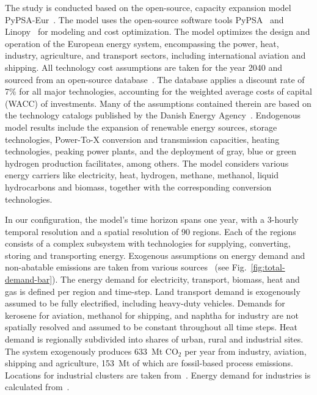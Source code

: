 \documentclass[twocolumn]{article}
\newcommand{\carbon}{CO$_2$}
\begin{document}
The study is conducted based on the open-source, capacity expansion model PyPSA-Eur~\cite{horschPyPSAEurOpenOptimisation2018,brownSynergiesSectorCoupling2018,PyPSAEurSecSectorCoupledOpen2023}.
The model uses the open-source software tools PyPSA~\cite{brownPyPSAPythonPower2018} and Linopy~\cite{hofmannLinopyLinearOptimization2023}
for modeling and cost optimization.
The model optimizes the design and operation of the European energy system, encompassing the power, heat, industry, agriculture, and transport sectors, including international aviation and shipping.
All technology cost assumptions are taken for the year 2040 and sourced from an open-source database~\cite{zeyenPyPSATechnologydataTechnology2023}. The database applies a discount rate of 7\% for all major technologies, accounting for the weighted average costs of capital (WACC) of investments.
Many of the assumptions contained therein are based on the technology catalogs published by the Danish Energy Agency~\cite{danishenergyagencyTechnologyDataGeneration2019,thedanishenergyagencyTechnologyDataCarbon2023}.
Endogenous model results include the expansion of renewable energy sources, storage technologies, Power-To-X conversion and transmission capacities, heating technologies, peaking power plants, and the deployment of gray, blue or green hydrogen production facilitates, among others.
The model considers various energy carriers like electricity, heat, hydrogen, methane, methanol, liquid hydrocarbons and biomass, together with the corresponding conversion technologies.



%
In our configuration, the model's time horizon spans one year, with a 3-hourly temporal resolution and a spatial resolution of 90 regions. Each of the regions consists of a complex subsystem with technologies for supplying, converting, storing and transporting energy. Exogenous assumptions on energy demand and non-abatable emissions are taken from various sources~\cite{piamanzGeoreferencedIndustrialSites2018,muehlenpfordtTimeSeries2019,mantzosJRCIDEES20152018,NationalEmissionsReported2023,EurostatCompleteEnergyBalance,uwekrienDemandlib2023} (see Fig.~\ref{fig:total-demand-bar}). The energy demand for electricity, transport, biomass, heat and gas is defined per region and time-step.
Land transport demand is exogenously assumed to be fully electrified, including heavy-duty vehicles.
Demands for kerosene for aviation, methanol for shipping, and naphtha for industry are not spatially resolved and assumed to be constant throughout all time steps.
Heat demand is regionally subdivided into shares of urban, rural and industrial sites.
The system exogenously produces 633~Mt \carbon{} per year from industry, aviation, shipping and agriculture, 153~Mt of which are fossil-based process emissions.
Locations for industrial clusters are taken from~\cite{hotmaps_industrial_db}. Energy demand for industries is calculated from~\cite{mantzosJRCIDEES20152018}.
\end{document}
